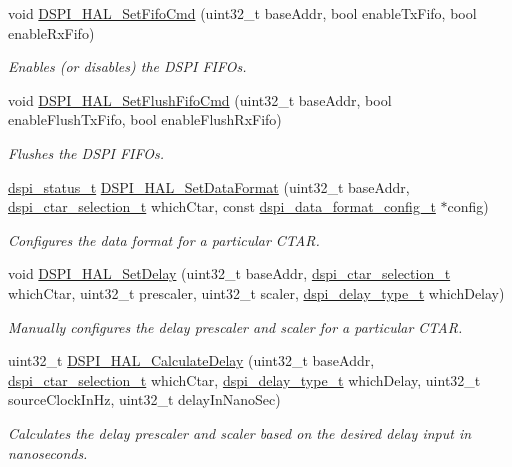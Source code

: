 \begin{DoxyCompactItemize}
void \hyperlink{group__dspi__hal_ga83363cb5c1c771b1dadfbb4e6a5b84f9}{D\+S\+P\+I\+\_\+\+H\+A\+L\+\_\+\+Set\+Fifo\+Cmd} (uint32\+\_\+t base\+Addr, bool enable\+Tx\+Fifo, bool enable\+Rx\+Fifo)
\begin{DoxyCompactList}\small\item\em Enables (or disables) the D\+S\+PI F\+I\+F\+Os. \end{DoxyCompactList}\item 
void \hyperlink{group__dspi__hal_ga4cc1d890bdeca0e0dd2b289d124e78b5}{D\+S\+P\+I\+\_\+\+H\+A\+L\+\_\+\+Set\+Flush\+Fifo\+Cmd} (uint32\+\_\+t base\+Addr, bool enable\+Flush\+Tx\+Fifo, bool enable\+Flush\+Rx\+Fifo)
\begin{DoxyCompactList}\small\item\em Flushes the D\+S\+PI F\+I\+F\+Os. \end{DoxyCompactList}\item 
\hyperlink{group__dspi__hal_ga22d7dd51eeb108e60311c4139d619e12}{dspi\+\_\+status\+\_\+t} \hyperlink{group__dspi__hal_ga349aed7131a754766b0375ba2028daf9}{D\+S\+P\+I\+\_\+\+H\+A\+L\+\_\+\+Set\+Data\+Format} (uint32\+\_\+t base\+Addr, \hyperlink{group__dspi__hal_ga8d2c04fe9fd119bdcc613f4c35095721}{dspi\+\_\+ctar\+\_\+selection\+\_\+t} which\+Ctar, const \hyperlink{group__dspi__hal_ga0eeb6e5b9b331a951edcf24c269bdfcd}{dspi\+\_\+data\+\_\+format\+\_\+config\+\_\+t} $\ast$config)
\begin{DoxyCompactList}\small\item\em Configures the data format for a particular C\+T\+AR. \end{DoxyCompactList}\item 
void \hyperlink{group__dspi__hal_ga777d6d624b0d638b3ec3e4532e26e2ad}{D\+S\+P\+I\+\_\+\+H\+A\+L\+\_\+\+Set\+Delay} (uint32\+\_\+t base\+Addr, \hyperlink{group__dspi__hal_ga8d2c04fe9fd119bdcc613f4c35095721}{dspi\+\_\+ctar\+\_\+selection\+\_\+t} which\+Ctar, uint32\+\_\+t prescaler, uint32\+\_\+t scaler, \hyperlink{group__dspi__hal_gaf817b2c70ff1e28088181cd418f4528b}{dspi\+\_\+delay\+\_\+type\+\_\+t} which\+Delay)
\begin{DoxyCompactList}\small\item\em Manually configures the delay prescaler and scaler for a particular C\+T\+AR. \end{DoxyCompactList}\item 
uint32\+\_\+t \hyperlink{group__dspi__hal_ga93d0ac8aa458b6cce74efd6d7eb7f3c7}{D\+S\+P\+I\+\_\+\+H\+A\+L\+\_\+\+Calculate\+Delay} (uint32\+\_\+t base\+Addr, \hyperlink{group__dspi__hal_ga8d2c04fe9fd119bdcc613f4c35095721}{dspi\+\_\+ctar\+\_\+selection\+\_\+t} which\+Ctar, \hyperlink{group__dspi__hal_gaf817b2c70ff1e28088181cd418f4528b}{dspi\+\_\+delay\+\_\+type\+\_\+t} which\+Delay, uint32\+\_\+t source\+Clock\+In\+Hz, uint32\+\_\+t delay\+In\+Nano\+Sec)
\begin{DoxyCompactList}\small\item\em Calculates the delay prescaler and scaler based on the desired delay input in nanoseconds. \end{DoxyCompactList}\end{DoxyCompactItemize}
